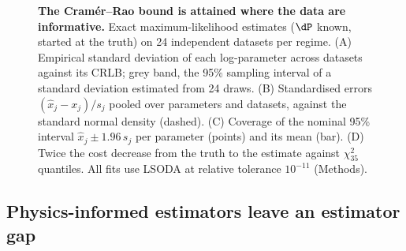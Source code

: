 \begin{figure}[tbp]
\centering
{}
\caption{\textbf{The Cram\'er--Rao bound is attained where the data are informative.} Exact maximum-likelihood
estimates ($\dP$ known, started at the truth) on 24 independent datasets per
regime. (A) Empirical standard deviation of each log-parameter across datasets
against its CRLB; grey band, the 95\% sampling interval of a standard deviation
estimated from 24 draws. (B) Standardised errors $(\hat x_j-x_j)/s_j$ pooled
over parameters and datasets, against the standard normal density (dashed). (C)
Coverage of the nominal 95\% interval $\hat x_j\pm1.96\,s_j$ per parameter
(points) and its mean (bar). (D) Twice the cost decrease from the truth to the
estimate against $\chi^2_{35}$ quantiles. All fits use LSODA at relative
tolerance $10^{-11}$ (Methods).}
\label{fig:mc}
\end{figure}

\subsection{Physics-informed estimators leave an estimator gap}
\label{sec:res-gap}

